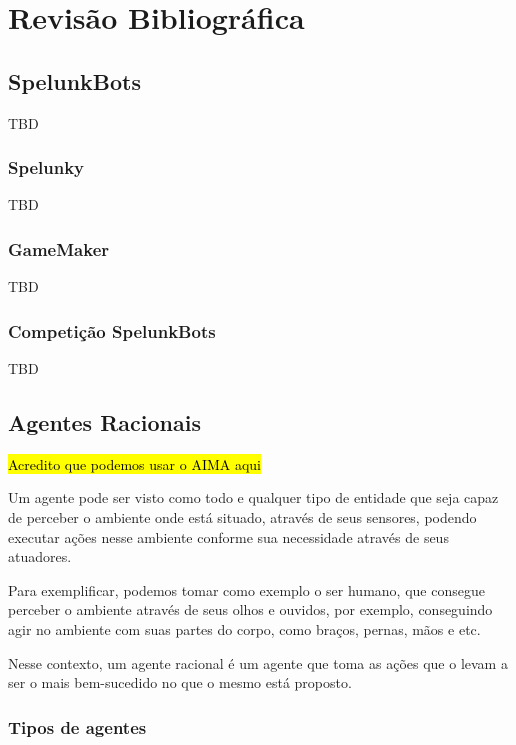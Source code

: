 \chapter{\label{chap:lit-review}Revisão Bibliográfica}

\section{SpelunkBots}

TBD

\subsection{Spelunky}

TBD

\subsection{GameMaker}

TBD

\subsection{Competição SpelunkBots}

TBD

\section{Agentes Racionais}

\hl{Acredito que podemos usar o AIMA aqui}

Um agente pode ser visto como todo e qualquer tipo de entidade que seja capaz
de perceber o ambiente onde está situado, através de seus sensores, podendo
executar ações nesse ambiente conforme sua necessidade através de seus atuadores.

Para exemplificar, podemos tomar como exemplo o ser humano, que consegue
perceber o ambiente através de seus olhos e ouvidos, por exemplo, conseguindo
agir no ambiente com suas partes do corpo, como braços, pernas, mãos e etc.

Nesse contexto, um agente racional é um agente que toma as ações que o levam a
ser o mais bem-sucedido no que o mesmo está proposto.

\subsection{Tipos de agentes}

